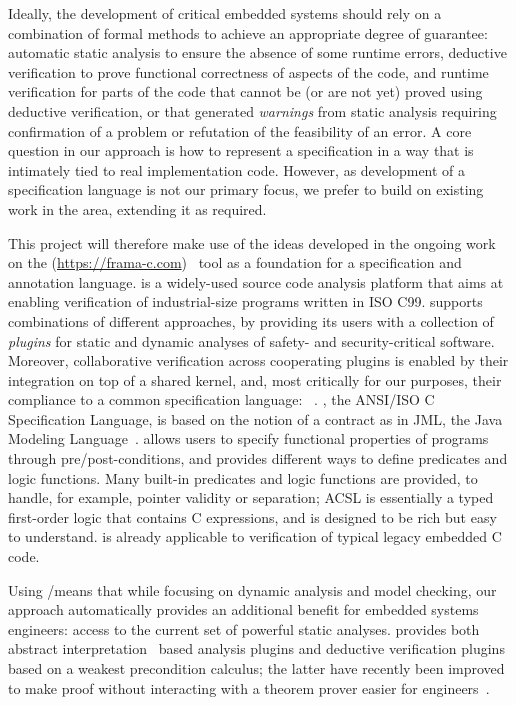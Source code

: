 Ideally, the development of critical embedded systems should rely on a combination of formal methods to achieve an appropriate degree of guarantee:
automatic static analysis to ensure the absence of some runtime errors,
deductive verification to prove functional correctness of aspects of the code,
and runtime verification for parts of the code that cannot be (or are not yet) proved using deductive verification,
or that generated \emph{warnings} from static analysis requiring confirmation of a problem or refutation of the feasibility of an error.  A core question in our approach is how to represent a specification in a way that is intimately tied to real implementation code.  However, as development of a specification language is not our primary focus, we prefer to build on existing work in the area, extending it as required.

This project will therefore make use of the ideas developed in the ongoing work on the \framac{} (\url{https://frama-c.com})~\cite{KKP2015:FAC} tool as a foundation for a specification and annotation language.
\framac is a widely-used source code analysis platform that aims at enabling verification of industrial-size programs written in ISO C99.
\framac{} supports combinations of different approaches, by providing its users with a collection of \emph{plugins} for static and dynamic analyses of safety- and security-critical software.
Moreover, collaborative verification across cooperating plugins is enabled by their integration on top of a shared kernel, and, most critically for our purposes, their compliance to a common specification language: \acsl~\cite{ACSL}.
\acsl, the ANSI/ISO C Specification Language, is based on the notion of a contract as in JML, the Java Modeling Language~\cite{jml}.
\acsl allows users to specify functional properties of programs through pre/post-conditions, and provides different ways to define predicates and logic functions.
Many built-in predicates and logic functions are provided, to handle, for example, pointer validity or separation; ACSL is essentially a typed first-order logic that contains C expressions, and is designed to be rich but easy to understand.
\framac is already applicable to verification of typical legacy embedded C code.

Using \acsl/\framac means that while focusing on dynamic analysis and model checking, our approach automatically provides an additional benefit for embedded systems engineers: access to the current set of powerful \framac static analyses.  \framac provides both abstract interpretation~\cite{cousot77} based analysis plugins and deductive verification plugins based on a weakest precondition calculus; the latter have recently been improved to make proof without interacting with a theorem prover easier for engineers~\cite{BLK2019:NFM}.

